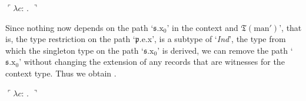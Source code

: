 \begin{ex} 
  $\ulcorner\lambda c$:
  . $\urcorner$ 
\end{ex} 
Since nothing now depends on the path `$\mathfrak{s}.\text{x}_0$' in
the context and $\mathfrak{T}(\text{man}')$', that is, the type
restriction on the path `$\mathfrak{p}$.e.x', is a subtype of
`\textit{Ind}', the type from which the singleton type on the path
`$\mathfrak{s}.\text{x}_0$' is derived, we can remove the path `$\mathfrak{s}.\text{x}_0$'
without changing the extension of any records that are witnesses for the
context type.  Thus we obtain \nexteg{}.
\begin{ex} 
  $\ulcorner\lambda c$:
  . $\urcorner$ 
\end{ex}

